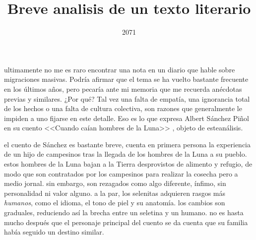 \documentclass[a3paper]{tufte-handout}
\title{Breve analisis de un texto literario}
\date{2071}
\begin{document}
\maketitle


ultimamente no me es raro encontrar una nota en un diario que hable sobre migraciones masivas. Podría afirmar que el tema se ha vuelto bastante frecuente en los últimos años, pero pecaría ante mi memoria que me recuerda anécdotas previas y similares. ¿Por qué? Tal vez una falta de empatía, una ignorancia total de los hechos o una falta de cultura colectiva, son razones que generalmente le impiden a uno fijarse en este detalle. Eso es lo que expresa Albert Sánchez Piñol en su cuento <<Cuando caían hombres de la Luna>> \citep{Albert}, objeto de esteanálisis. 

el cuento de Sánchez es bastante breve, cuenta en primera persona la experiencia de un hijo de campesinos tras la llegada de los hombres de la Luna a su pueblo. estos hombres de la Luna bajan a la Tierra desprovistos de alimento y refugio, de modo que son contratados por los campesinos para realizar la cosecha pero a medio jornal. sin embargo, son rezagados como algo diferente, ínfimo, sin personalidad ni valor alguno. a la par, los selenitas adquieren rasgos más \emph{humanos}, como el idioma, el tono de piel y su anatomía. los cambios son graduales, reduciendo así la brecha entre un seletina y un humano. no es hasta mucho después que el personaje principal del cuento se da cuenta que su familia había seguido un destino similar.
\end{document}
